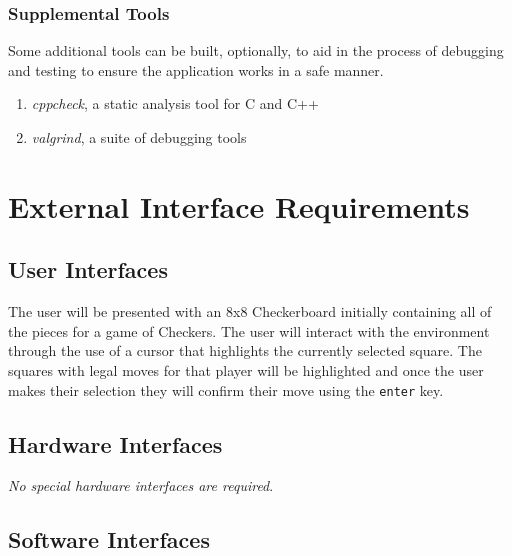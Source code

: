 \documentclass[letterpaper]{article}
\begin{document}
\subsubsection{Supplemental Tools}
\label{sec:description_dependencies_supplemental}

Some additional tools can be built, optionally, to aid in the
process of debugging and testing to ensure the application works
in a safe manner.

\begin{enumerate}
    \item \emph{cppcheck}, a static analysis tool for C and C++
          ~\cite{cppcheck}
    \item \emph{valgrind}, a suite of debugging tools
          ~\cite{valgrind}
\end{enumerate}


\section{External Interface Requirements}
\label{sec:iface_reqs}

\subsection{User Interfaces}
\label{sec:iface_reqs_user}

The user will be presented with an 8x8 Checkerboard initially
containing all of the pieces for a game of Checkers. The
user will interact with the environment through the use
of a cursor that highlights the currently selected square. The
squares with legal moves for that player will be highlighted and
once the user makes their selection they will confirm their move
using the \texttt{enter} key.

\subsection{Hardware Interfaces}
\label{sec:iface_reqs_hardware}

\emph{No special hardware interfaces are required}.

\subsection{Software Interfaces}
\label{sec:iface_reqs_software}
\end{document}

